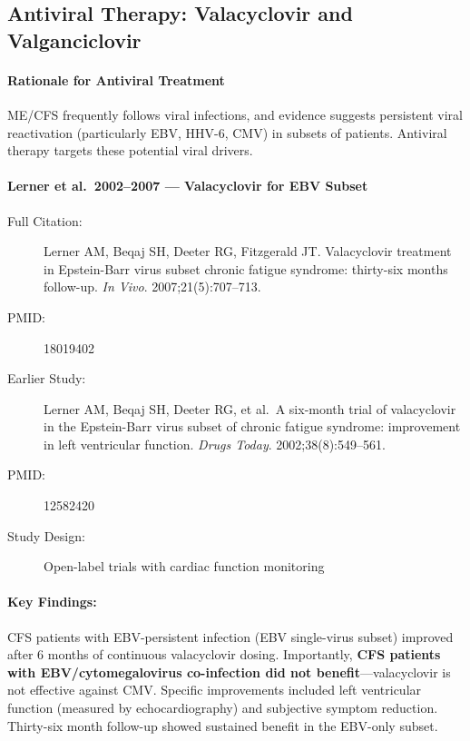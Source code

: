 \subsection{Antiviral Therapy: Valacyclovir and Valganciclovir}

\paragraph{Rationale for Antiviral Treatment}

ME/CFS frequently follows viral infections, and evidence suggests persistent viral reactivation (particularly EBV, HHV-6, CMV) in subsets of patients. Antiviral therapy targets these potential viral drivers.

\paragraph{Lerner et al.\ 2002--2007 --- Valacyclovir for EBV Subset}

\begin{description}
    \item[Full Citation:] Lerner AM, Beqaj SH, Deeter RG, Fitzgerald JT. Valacyclovir treatment in Epstein-Barr virus subset chronic fatigue syndrome: thirty-six months follow-up. \textit{In Vivo}. 2007;21(5):707--713.
    \item[PMID:] 18019402
    \item[Earlier Study:] Lerner AM, Beqaj SH, Deeter RG, et al.\ A six-month trial of valacyclovir in the Epstein-Barr virus subset of chronic fatigue syndrome: improvement in left ventricular function. \textit{Drugs Today}. 2002;38(8):549--561.
    \item[PMID:] 12582420
    \item[Study Design:] Open-label trials with cardiac function monitoring
\end{description}

\paragraph{Key Findings:}
CFS patients with EBV-persistent infection (EBV single-virus subset) improved after 6 months of continuous valacyclovir dosing. Importantly, \textbf{CFS patients with EBV/cytomegalovirus co-infection did not benefit}---valacyclovir is not effective against CMV. Specific improvements included left ventricular function (measured by echocardiography) and subjective symptom reduction. Thirty-six month follow-up showed sustained benefit in the EBV-only subset.

